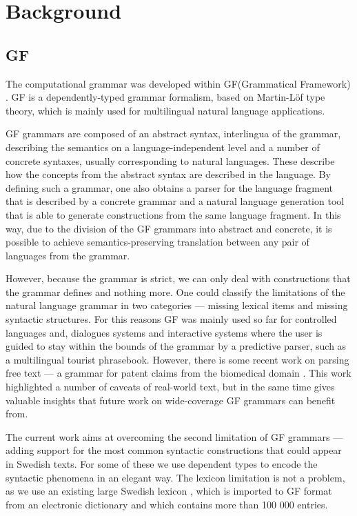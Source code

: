 \documentclass[runningheads,a4paper]{llncs}
\begin{document}


\section{Background}

\subsection{GF}
\label{sec:gf}

The computational grammar was developed within GF(Grammatical
Framework) \cite{gfbok}. GF is a dependently-typed grammar formalism,
based on Martin-Löf type theory, which is mainly used for
multilingual natural language applications. 

GF grammars are composed of an abstract syntax, interlingua of the
grammar, describing the semantics on a language-independent level and
a number of concrete syntaxes, usually corresponding to natural
languages. These describe how the concepts from the abstract syntax
are described in the language. 
By defining such a grammar, one also obtains a parser for the language
fragment that is described by a concrete grammar and a natural
language generation tool that is able to generate constructions from
the same language fragment. 
In this way, due to the division of the GF
grammars into abstract and concrete, it is possible to achieve 
semantics-preserving translation between any pair of languages from 
the grammar. 
 
However, because the grammar is strict, we can only deal with
constructions that the grammar defines and nothing more. One could
classify the limitations of the natural language grammar in two
categories --- missing lexical items and missing syntactic
structures. For this reasons GF was mainly used so far for controlled
languages\cite{cnl} and, dialogues systems \cite{talk} and interactive 
systems where the user is guided to stay
within the bounds of the grammar by a predictive
parser\cite{parser}, such as a multilingual tourist
phrasebook\cite{phrasebook}. 
However, there is some recent work on parsing
free text --- a grammar for patent claims from the biomedical
domain \cite{patent}. This work highlighted a
number of caveats of real-world text, but in the same time gives
valuable insights that future work on wide-coverage GF grammars can
benefit from.

The current work aims at overcoming the second limitation of GF
grammars --- adding support for the most common syntactic
constructions that could appear in Swedish texts. For some of these we
use dependent types to encode the syntactic phenomena in an elegant
way. The lexicon limitation is not a problem, as we use an existing 
large Swedish lexicon \cite{ahlbergEnache}, which is imported to GF
format from an electronic dictionary and which contains more than
100 000 entries.
\end{document}

